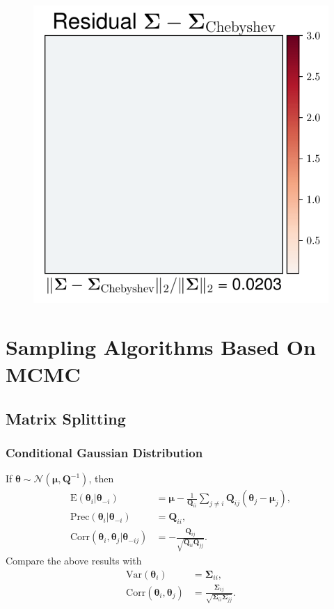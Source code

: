 \documentclass[aspectratio=169]{beamer}
\newcommand{\B}[1]{\mathbf{#1}} %
\newcommand{\Bs}[1]{\boldsymbol{#1}} %
\begin{document}
\begin{frame}
\begin{figure}
    \mbox{{\includegraphics[scale=0.3]{src/images/simu1_ex2_A_Cheby.pdf}}}
  \end{figure}
\end{frame}

\section{Sampling Algorithms Based On MCMC}
\subsection{Matrix Splitting}
\begin{frame}
\frametitle{Conditional Gaussian Distribution}
If $\Bs{\theta} \sim \mathcal{N}(\Bs{\mu},\B{Q}^{-1})$, then
\[
\begin{aligned}
\text{E}(\Bs{\theta}_i | \Bs{\theta}_{-i}) &= \Bs{\mu} - \frac{1}{\B{Q}_{ii} }\sum_{j\ne i} \B{Q}_{ij} (\Bs{\theta}_j - \Bs{\mu}_j), \\
\text{Prec}(\Bs{\theta}_i | \Bs{\theta}_{-i}) &= \B{Q}_{ii}, \\
\text{Corr}(\Bs{\theta}_i, \Bs{\theta}_j | \Bs{\theta}_{-ij}) &= -\frac{\B{Q}_{ij}}{\sqrt{\B{Q}_{ii}\B{Q}_{jj}}}.
\end{aligned}
\]
Compare the above results with
\[
\begin{aligned}
\text{Var}(\Bs{\theta}_i) &= \Bs{\Sigma}_{ii}, \\
\text{Corr}(\Bs{\theta}_i, \Bs{\theta}_j) &= \frac{\Bs{\Sigma}_{ij}}{\sqrt{\Bs{\Sigma}_{ii}\Bs{\Sigma}_{jj}}}.
\end{aligned}
\]
\end{frame}
\end{document}
